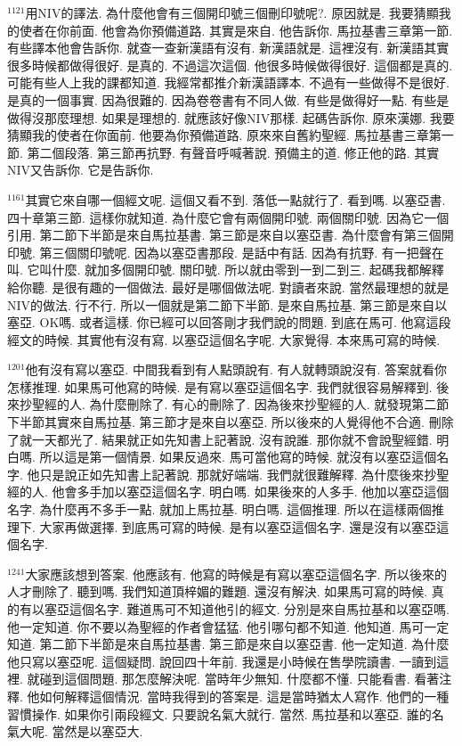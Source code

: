 \documentclass{book}
\begin{document}
$^{1121}$用NIV的譯法.
為什麼他會有三個開印號三個刪印號呢?.
原因就是.
我要猜顯我的使者在你前面.
他會為你預備道路.
其實是來自.
他告訴你.
馬拉基書三章第一節.
有些譯本他會告訴你.
就查一查新漢語有沒有.
新漢語就是.
這裡沒有.
新漢語其實很多時候都做得很好.
是真的.
不過這次這個.
他很多時候做得很好.
這個都是真的.
可能有些人上我的課都知道.
我經常都推介新漢語譯本.
不過有一些做得不是很好.
是真的一個事實.
因為很難的.
因為卷卷書有不同人做.
有些是做得好一點.
有些是做得沒那麼理想.
如果是理想的.
就應該好像NIV那樣.
起碼告訴你.
原來漢娜.
我要猜顯我的使者在你面前.
他要為你預備道路.
原來來自舊約聖經.
馬拉基書三章第一節.
第二個段落.
第三節再抗野.
有聲音呼喊著說.
預備主的道.
修正他的路.
其實NIV又告訴你.
它是告訴你.

$^{1161}$其實它來自哪一個經文呢.
這個又看不到.
落低一點就行了.
看到嗎.
以塞亞書.
四十章第三節.
這樣你就知道.
為什麼它會有兩個開印號.
兩個關印號.
因為它一個引用.
第二節下半節是來自馬拉基書.
第三節是來自以塞亞書.
為什麼會有第三個開印號.
第三個關印號呢.
因為以塞亞書那段.
是話中有話.
因為有抗野.
有一把聲在叫.
它叫什麼.
就加多個開印號.
關印號.
所以就由零到一到二到三.
起碼我都解釋給你聽.
是很有趣的一個做法.
最好是哪個做法呢.
對讀者來說.
當然最理想的就是NIV的做法.
行不行.
所以一個就是第二節下半節.
是來自馬拉基.
第三節是來自以塞亞.
OK嗎.
或者這樣.
你已經可以回答剛才我們說的問題.
到底在馬可.
他寫這段經文的時候.
其實他有沒有寫.
以塞亞這個名字呢.
大家覺得.
本來馬可寫的時候.

$^{1201}$他有沒有寫以塞亞.
中間我看到有人點頭說有.
有人就轉頭說沒有.
答案就看你怎樣推理.
如果馬可他寫的時候.
是有寫以塞亞這個名字.
我們就很容易解釋到.
後來抄聖經的人.
為什麼刪除了.
有心的刪除了.
因為後來抄聖經的人.
就發現第二節下半節其實來自馬拉基.
第三節才是來自以塞亞.
所以後來的人覺得他不合適.
刪除了就一天都光了.
結果就正如先知書上記著說.
沒有說誰.
那你就不會說聖經錯.
明白嗎.
所以這是第一個情景.
如果反過來.
馬可當他寫的時候.
就沒有以塞亞這個名字.
他只是說正如先知書上記著說.
那就好端端.
我們就很難解釋.
為什麼後來抄聖經的人.
他會多手加以塞亞這個名字.
明白嗎.
如果後來的人多手.
他加以塞亞這個名字.
為什麼再不多手一點.
就加上馬拉基.
明白嗎.
這個推理.
所以在這樣兩個推理下.
大家再做選擇.
到底馬可寫的時候.
是有以塞亞這個名字.
還是沒有以塞亞這個名字.

$^{1241}$大家應該想到答案.
他應該有.
他寫的時候是有寫以塞亞這個名字.
所以後來的人才刪除了.
聽到嗎.
我們知道頂梓媚的難題.
還沒有解決.
如果馬可寫的時候.
真的有以塞亞這個名字.
難道馬可不知道他引的經文.
分別是來自馬拉基和以塞亞嗎.
他一定知道.
你不要以為聖經的作者會猛猛.
他引哪句都不知道.
他知道.
馬可一定知道.
第二節下半節是來自馬拉基書.
第三節是來自以塞亞書.
他一定知道.
為什麼他只寫以塞亞呢.
這個疑問.
說回四十年前.
我還是小時候在售學院讀書.
一讀到這裡.
就碰到這個問題.
那怎麼解決呢.
當時年少無知.
什麼都不懂.
只能看書.
看著注釋.
他如何解釋這個情況.
當時我得到的答案是.
這是當時猶太人寫作.
他們的一種習慣操作.
如果你引兩段經文.
只要說名氣大就行.
當然.
馬拉基和以塞亞.
誰的名氣大呢.
當然是以塞亞大.
\end{document}
